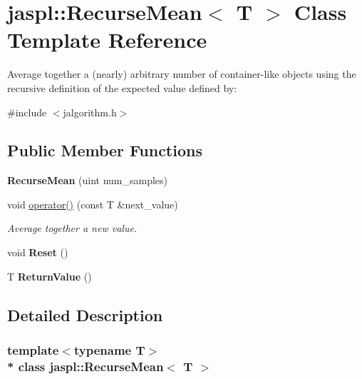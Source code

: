 \hypertarget{classjaspl_1_1_recurse_mean}{}\section{jaspl\+:\+:Recurse\+Mean$<$ T $>$ Class Template Reference}
\label{classjaspl_1_1_recurse_mean}


Average together a (nearly) arbitrary number of container-\/like objects using the recursive definition of the expected value defined by\+:  




{\ttfamily \#include $<$jalgorithm.\+h$>$}

\subsection*{Public Member Functions}
\begin{DoxyCompactItemize}
\item 
{\bfseries Recurse\+Mean} (uint num\+\_\+samples)\hypertarget{classjaspl_1_1_recurse_mean_abbcaa2624b48de1a68407cc44ca9068d}{}\label{classjaspl_1_1_recurse_mean_abbcaa2624b48de1a68407cc44ca9068d}

\item 
void \hyperlink{classjaspl_1_1_recurse_mean_a5c65990ad47245fcf866ad811cd340c3}{operator()} (const T \&next\+\_\+value)
\begin{DoxyCompactList}\small\item\em Average together a new value. \end{DoxyCompactList}\item 
void {\bfseries Reset} ()\hypertarget{classjaspl_1_1_recurse_mean_ac661dff7908c06fe1701feb7d0d07af5}{}\label{classjaspl_1_1_recurse_mean_ac661dff7908c06fe1701feb7d0d07af5}

\item 
T {\bfseries Return\+Value} ()\hypertarget{classjaspl_1_1_recurse_mean_ad9ec10f40cbfdc5f9799be43e0855572}{}\label{classjaspl_1_1_recurse_mean_ad9ec10f40cbfdc5f9799be43e0855572}

\end{DoxyCompactItemize}


\subsection{Detailed Description}
\subsubsection*{template$<$typename T$>$\\*
class jaspl\+::\+Recurse\+Mean$<$ T $>$}

